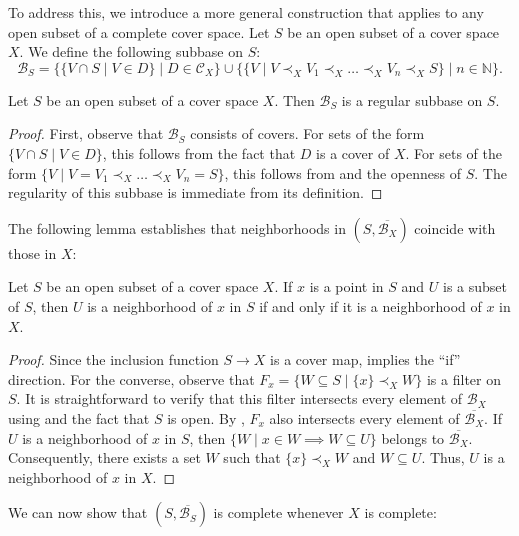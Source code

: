 \documentclass[reqno]{amsart}
\theoremstyle{definition}
\theoremstyle{remark}
\numberwithin{figure}{section}
\newcommand{\rb}{\prec}
\begin{document}
To address this, we introduce a more general construction that applies to any open subset of a complete cover space.
Let $S$ be an open subset of a cover space $X$.
We define the following subbase on $S$:
\[ \mathcal{B}_S = \{ \{ V \cap S \mid V \in D \} \mid D \in \mathcal{C}_X \} \cup \{ \{ V \mid V \rb_X V_1 \rb_X \ldots \rb_X V_n \rb_X S \} \mid n \in \mathbb{N} \}. \]

\begin{lem}
Let $S$ be an open subset of a cover space $X$.
Then $\mathcal{B}_S$ is a regular subbase on $S$.
\end{lem}
\begin{proof}
First, observe that $\mathcal{B}_S$ consists of covers.
For sets of the form $\{ V \cap S \mid V \in D \}$, this follows from the fact that $D$ is a cover of $X$.
For sets of the form $\{ V \mid V = V_1 \rb_X \ldots \rb_X V_n = S \}$, this follows from  and the openness of $S$.
The regularity of this subbase is immediate from its definition.
\end{proof}

The following lemma establishes that neighborhoods in $(S,\overline{\mathcal{B}_X})$ coincide with those in $X$:

\begin{lem}
Let $S$ be an open subset of a cover space $X$.
If $x$ is a point in $S$ and $U$ is a subset of $S$, then $U$ is a neighborhood of $x$ in $S$ if and only if it is a neighborhood of $x$ in $X$.
\end{lem}
\begin{proof}
Since the inclusion function $S \to X$ is a cover map,  implies the ``if'' direction.
For the converse, observe that $F_x = \{ W \subseteq S \mid \{ x \} \rb_X W \}$ is a filter on $S$.
It is straightforward to verify that this filter intersects every element of $\mathcal{B}_X$ using  and the fact that $S$ is open.
By , $F_x$ also intersects every element of $\overline{\mathcal{B}_X}$.
If $U$ is a neighborhood of $x$ in $S$, then $\{ W \mid x \in W \implies W \subseteq U \}$ belongs to $\overline{\mathcal{B}_X}$.
Consequently, there exists a set $W$ such that $\{ x \} \rb_X W$ and $W \subseteq U$.
Thus, $U$ is a neighborhood of $x$ in $X$.
\end{proof}

We can now show that $(S,\overline{\mathcal{B}_S})$ is complete whenever $X$ is complete:
\end{document}
